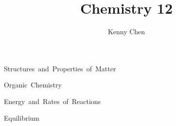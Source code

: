 \documentclass[12pt]{report}
\title{Chemistry 12}
\author{Kenny Chen}
\begin{document}
\maketitle
\tableofcontents
\newpage

\unit{Structures and Properties of Matter}










\unit{Organic Chemistry}




\unit{Energy and Rates of Reactions}







\unit{Equilibrium}





\end{document}
